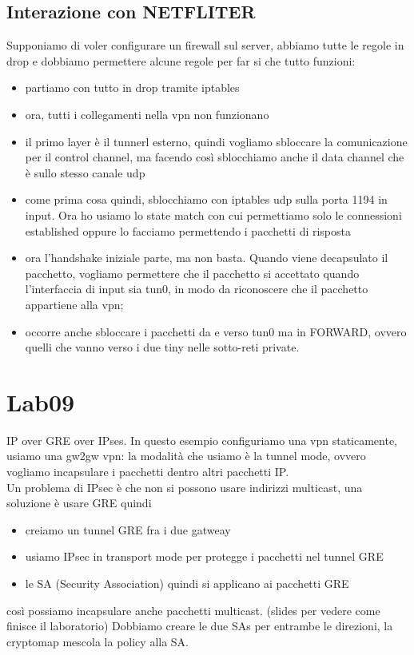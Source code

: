 \documentclass[12pt, oneside]{extbook} %
\begin{document}
\subsection{Interazione con NETFLITER}
Supponiamo di voler configurare un firewall sul server, abbiamo tutte le regole in drop e dobbiamo permettere alcune regole per far si che tutto funzioni:
\begin{itemize}
\item partiamo con tutto in drop tramite iptables
\item ora, tutti i collegamenti nella vpn non funzionano
\item il primo layer è il tunnerl esterno, quindi vogliamo sbloccare la comunicazione per il control channel, ma facendo così sblocchiamo anche il data channel che è sullo stesso canale udp
\item come prima cosa quindi, sblocchiamo con iptables udp sulla porta 1194 in input. Ora ho usiamo lo state match con cui permettiamo solo le connessioni established oppure lo facciamo permettendo i pacchetti di risposta
\item ora l'handshake iniziale parte, ma non basta. Quando viene decapsulato il pacchetto, vogliamo permettere che il pacchetto si accettato quando l'interfaccia di input sia tun0, in modo da riconoscere che il pacchetto appartiene alla vpn;
\item occorre anche sbloccare i pacchetti da e verso tun0 ma in FORWARD, ovvero quelli che vanno verso i due tiny nelle sotto-reti private.
\end{itemize}
\section*{Lab09}
IP over GRE over IPses. In questo esempio configuriamo una vpn staticamente, usiamo una gw2gw vpn: la modalità che usiamo è la tunnel mode, ovvero vogliamo incapsulare i pacchetti dentro altri pacchetti IP.\\Un problema di IPsec è che non si possono usare indirizzi multicast, una soluzione è usare GRE quindi
\begin{itemize}
\item creiamo un tunnel GRE fra i due gatweay
\item usiamo IPsec in transport mode per protegge i pacchetti nel tunnel GRE
\item le SA (Security Association) quindi si applicano ai pacchetti GRE
\end{itemize}
così possiamo incapsulare anche pacchetti multicast.
(slides per vedere come finisce il laboratorio)
Dobbiamo creare le due SAs per entrambe le direzioni, la cryptomap mescola la policy alla SA.
\end{document}
